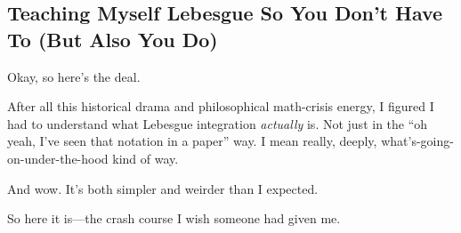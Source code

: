 \subsection{Teaching Myself Lebesgue So You Don’t Have To (But Also You Do)}

Okay, so here's the deal.

After all this historical drama and philosophical math-crisis energy, I figured I had to understand what Lebesgue integration \textit{actually} is. Not just in the “oh yeah, I’ve seen that notation in a paper” way. I mean really, deeply, what’s-going-on-under-the-hood kind of way.

And wow. It’s both simpler and weirder than I expected.

So here it is—the crash course I wish someone had given me.

